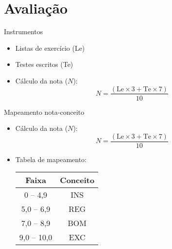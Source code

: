 \documentclass[
size=17pt,
paper=smartboard,
mode=present,
display=slidesnotes,
style=paintings,
nopagebreaks,
blackslide,
fleqn]{powerdot}
\begin{document}
   \section[ slide = false ]{Avaliação}
      \begin{slide}[toc=]{Instrumentos}
         \begin{itemize}
            \item Listas de exercício (Le)
            \item Testes escritos (Te)
            \item Cálculo da nota ($N$):
            \begin{equation*}
               N=\frac{( \text{Le} \times 3 + \text{Te} \times 7 )} {10}
            \end{equation*}
          \end{itemize}
      \end{slide}
      
      \begin{slide}[toc=]{Mapeamento nota-conceito}
         \begin{itemize}
            \item Cálculo da nota ($N$): 
            \begin{equation*}
               N=\frac{( \text{Le} \times 3 + \text{Te} \times 7 )} {10}
            \end{equation*}
            \item Tabela de mapeamento:
            \begin{table}
               \centering
               \begin{tabular}{c|c}
                  \hline\hline
                  \textbf{Faixa} & \textbf{Conceito}\\
                  \hline
                  0 -- 4,9 & INS\\
                  5,0 -- 6,9 & REG\\
                  7,0 -- 8,9 & BOM\\
                  9,0 -- 10,0 & EXC\\
                  \hline\hline
               \end{tabular}
            \end{table}    
         \end{itemize}
      \end{slide}
      
\end{document}
